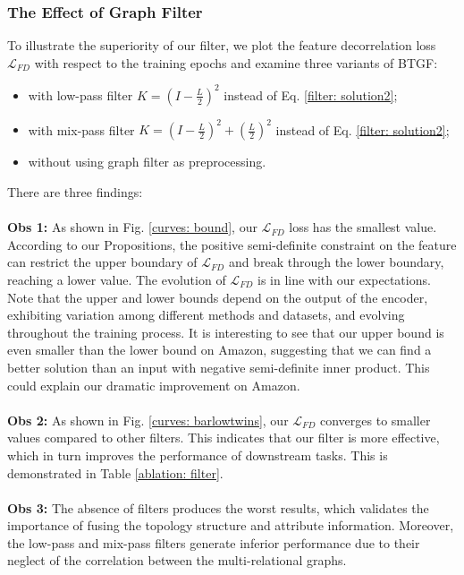 \documentclass[letterpaper]{article} %
\begin{document}
\subsubsection{The Effect of Graph Filter}
To illustrate the superiority of our filter, we plot the feature decorrelation loss $\mathcal{L}_{FD}$ with respect to the training epochs and examine three variants of BTGF:
\begin{itemize}
    \item with low-pass filter $K = (I-\frac{L}{2})^2 $ instead of Eq. \ref{filter: solution2};
    \item with mix-pass filter $K = (I-\frac{L}{2})^2 + (\frac{L}{2})^2$ instead of Eq. \ref{filter: solution2};
    \item without using graph filter as preprocessing.
\end{itemize}
There are three findings:\\
\\
\textbf{Obs 1:} As shown in Fig. \ref{curves: bound}, our $\mathcal{L}_{FD}$ loss has the smallest value. According to our Propositions, the positive semi-definite constraint on the feature can restrict the upper boundary of $\mathcal{L}_{FD}$ and break through the lower boundary, reaching a lower value. The evolution of $\mathcal{L}_{FD}$ is in line with our expectations. Note that the upper and lower bounds depend on the output of the encoder, exhibiting variation among different methods and datasets, and evolving throughout the training process. It is interesting to see that our upper bound is even smaller than the lower bound on Amazon, suggesting that we can find a better solution than an input with negative semi-definite inner product. This could explain our dramatic improvement on Amazon.\\
\\
\textbf{Obs 2:} As shown in Fig. \ref{curves: barlowtwins}, our $\mathcal{L}_{FD}$ converges to smaller values compared to other filters. This indicates that our filter is more effective, which in turn improves the performance of downstream tasks. This is demonstrated in Table \ref{ablation: filter}. \\
\\
\textbf{Obs 3:} The absence of filters produces the worst results, which validates the importance of fusing the topology structure and attribute information. Moreover, the low-pass and mix-pass filters generate inferior performance due to their neglect of the correlation between the multi-relational graphs.
\end{document}

